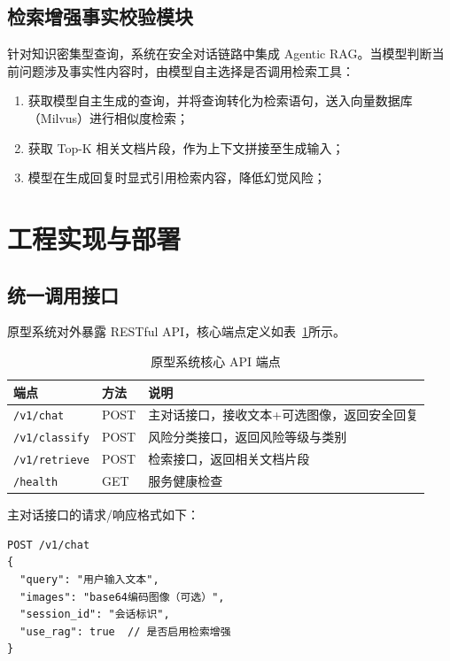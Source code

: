\subsection{检索增强事实校验模块}

针对知识密集型查询，系统在安全对话链路中集成 Agentic RAG。当模型判断当前问题涉及事实性内容时，由模型自主选择是否调用检索工具：

\begin{enumerate}
    \item 获取模型自主生成的查询，并将查询转化为检索语句，送入向量数据库（Milvus）进行相似度检索；
    \item 获取 Top-K 相关文档片段，作为上下文拼接至生成输入；
    \item 模型在生成回复时显式引用检索内容，降低幻觉风险；
\end{enumerate}

\section{工程实现与部署}

\subsection{统一调用接口}

原型系统对外暴露 RESTful API，核心端点定义如表~\ref{tab:api_endpoints}所示。

\begin{table}[!htb]
    \centering
    \caption{原型系统核心 API 端点}
    \label{tab:api_endpoints}
    \begin{tabular}{llp{6cm}}
        \toprule
        \textbf{端点} & \textbf{方法} & \textbf{说明} \\
        \midrule
        \texttt{/v1/chat} & POST & 主对话接口，接收文本+可选图像，返回安全回复 \\
        \texttt{/v1/classify} & POST & 风险分类接口，返回风险等级与类别 \\
        \texttt{/v1/retrieve} & POST & 检索接口，返回相关文档片段 \\
        \texttt{/health} & GET & 服务健康检查 \\
        \bottomrule
    \end{tabular}
\end{table}

主对话接口的请求/响应格式如下：

\begin{verbatim}
POST /v1/chat
{
  "query": "用户输入文本",
  "images": "base64编码图像（可选）",
  "session_id": "会话标识",
  "use_rag": true  // 是否启用检索增强
}
\end{verbatim}

